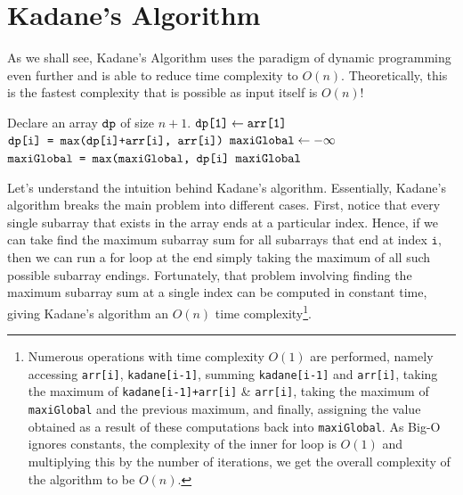 
\section{Kadane's Algorithm}

As we shall see, Kadane's Algorithm uses the paradigm of dynamic programming even further and is able to reduce time complexity to $O(n).$ Theoretically, this is the fastest complexity that is possible as input itself is $O(n)$! 

\begin{algorithm}
\caption{}\label{Kadane}
\begin{algorithmic}[1]
\State Declare an array $\texttt{dp}$ of size $n+1$.
\State $\texttt{dp[1]} \gets \texttt{arr[1]}$
    \State $\texttt{dp[i] = max(dp[i]+arr[i], arr[i])}$
\EndFor
\State $\texttt{maxiGlobal} \gets -\infty$ 
    \State $\texttt{maxiGlobal = max(maxiGlobal, dp[i]}$
\EndFor 
\State \Return $\texttt{maxiGlobal}$
\end{algorithmic}
\end{algorithm}

\noindent Let's understand the intuition behind Kadane's algorithm. Essentially, Kadane's algorithm breaks the main problem into different cases. First, notice that every single subarray that exists in the array ends at a particular index. Hence, if we can take find the maximum subarray sum for all subarrays that end at index $\texttt{i},$ then we can run a for loop at the end simply taking the maximum of all such possible subarray endings. Fortunately, that problem involving finding the maximum subarray sum at a single index can be computed in constant time, giving Kadane's algorithm an $O(n)$ time complexity\footnote{Numerous operations with time complexity $O(1)$ are performed, namely accessing \texttt{arr[i]}, \texttt{kadane[i-1]}, summing \texttt{kadane[i-1]} and \texttt{arr[i]}, taking the maximum of \texttt{kadane[i-1]+arr[i]} & \texttt{arr[i]}, taking the maximum of \texttt{maxiGlobal} and the previous maximum, and finally, assigning the value obtained as a result of these computations back into \texttt{maxiGlobal}. As Big-O ignores constants, the complexity of the inner for loop is $O(1)$ and multiplying this by the number of iterations, we get the overall complexity of the algorithm to be $O(n)$.}.
